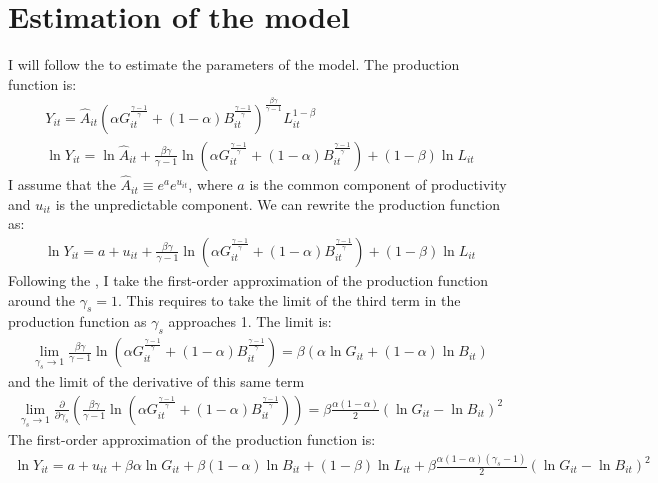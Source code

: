 \documentclass[11pt]{article}
\begin{document}
\section{Estimation of the model}
\label{Ap:estimation}
I will follow the \cite{kmenta1967estimation} to estimate the parameters of the model. The production function is:
\begin{gather*}
    Y_{it} = \hat{A}_{it}(
        \alpha G_{it}^{\frac{\gamma-1}{\gamma}} + (1-\alpha) B_{it}^{\frac{\gamma-1}{\gamma}}
    ) ^ {\frac{\beta\gamma}{\gamma-1}} L_{it}^{1-\beta}\\
    \ln Y_{it} = \ln \hat{A}_{it} + \frac{\beta\gamma}{\gamma-1} \ln(
        \alpha G_{it}^{\frac{\gamma-1}{\gamma}} + (1-\alpha) B_{it}^{\frac{\gamma-1}{\gamma}}
    ) + (1-\beta) \ln L_{it}
\end{gather*}
I assume that the $\hat{A}_{it} \equiv e^a e^{u_{it}}$, where $a$ is the common component of productivity and $u_{it}$ is the unpredictable component. We can rewrite the production function as:
\begin{gather*}
    \ln Y_{it} = a + u_{it} + \frac{\beta\gamma}{\gamma-1} \ln(
        \alpha G_{it}^{\frac{\gamma-1}{\gamma}} + (1-\alpha) B_{it}^{\frac{\gamma-1}{\gamma}}
    ) + (1-\beta) \ln L_{it}
\end{gather*}
Following the \cite{kmenta1967estimation}, I take the first-order approximation of the production function around the $\gamma_s = 1$. This requires to take the limit of the third term in the production function as $\gamma_s$ approaches 1. The limit is:
\begin{gather*}
    \lim_{\gamma_s \to 1} \frac{\beta\gamma}{\gamma-1} \ln(
        \alpha G_{it}^{\frac{\gamma-1}{\gamma}} + (1-\alpha) B_{it}^{\frac{\gamma-1}{\gamma}}
    ) = \beta (\alpha \ln G_{it}   + (1-\alpha)\ln B_{it} )
\end{gather*}
and the limit of the derivative of this same term
\begin{gather*}
    \lim_{\gamma_s \to 1} \frac{\partial}{\partial \gamma_s} \left( \frac{\beta\gamma}{\gamma-1} \ln(
        \alpha G_{it}^{\frac{\gamma-1}{\gamma}} + (1-\alpha) B_{it}^{\frac{\gamma-1}{\gamma}}
    ) \right) = \beta \frac{\alpha (1-\alpha)}{2}(\ln G_{it} - \ln B_{it})^2
\end{gather*}
The first-order approximation of the production function is:
\begin{gather*}
    \ln Y_{it} = a + u_{it} +  \beta\alpha \ln G_{it}   + \beta(1-\alpha)\ln B_{it} + (1-\beta) \ln L_{it} + \beta \frac{\alpha (1-\alpha)(\gamma_s - 1)}{2}(\ln G_{it} - \ln B_{it})^2
\end{gather*}
\end{document}

